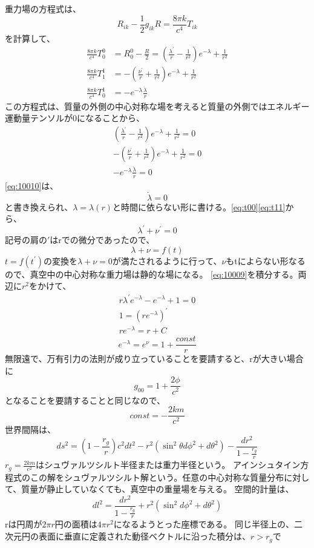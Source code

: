 \documentclass{jsarticle}
\newcommand{\half}{\frac{1}{2}}
\newcommand{\beq}{\begin{equation}}
\newcommand{\eeq}{\end{equation}}
\newcommand{\epikcf}{\frac{8 \pi k}{c^4}}
\newcommand{\nup}{\nu^\prime}
\newcommand{\lap}{\lambda^\prime}
\newcommand{\revrt}{\frac{1}{r^2}}
\begin{document}
重力場の方程式は、
\beq
R_{ik} - \half g_{ik} R = \frac{8 \pi k}{c^4}T_{ik}
\eeq
を計算して、
\begin{align}
    \epikcf T^0_0 &= R^0_0 - \frac{R}{2} = (\frac{\lambda^\prime}{r} - \frac{1}{r^2})e^{-\lambda} + \frac{1}{r^2} \label{eq:t00}\\ 
    \epikcf T^1_1 &= - (\frac{\nu^\prime}{r} + \frac{1}{r^2})e^{-\lambda} + \revrt \label{eq:t11}\\
    \epikcf T^1_0 &= - e^{-\lambda} \frac{\dot{\lambda}}{r}
\end{align}
この方程式は、質量の外側の中心対称な場を考えると質量の外側ではエネルギー運動量テンソルが$0$になることから、
\begin{align}
(\frac{\lambda^\prime}{r} - \frac{1}{r^2})e^{-\lambda} + \frac{1}{r^2} = 0\\ 
-(\frac{\nu^\prime}{r} + \frac{1}{r^2})e^{-\lambda} + \revrt = 0\label{eq:10009}\\
- e^{-\lambda} \frac{\dot{\lambda}}{r} = 0 \label{eq:10010}
\end{align}
\eqref{eq:10010}は、
\beq
\dot{\lambda} = 0 
\eeq
と書き換えられ、$\lambda = \lambda (r)$と時間に依らない形に書ける。\eqref{eq:t00}\eqref{eq:t11}から、
\beq
\lap + \nup = 0
\eeq
記号の肩の$\prime$はrでの微分であったので、
\beq
\lambda + \nu = f(t)
\eeq
$t=f(t^\prime)$の変換を$\lambda + \nu = 0$が満たされるように行って、$\nu$もtによらない形なるので、真空中の中心対称な重力場は静的な場になる。
\eqref{eq:10009}を積分する。両辺に$r^2$をかけて、
\begin{align}
r\lap e^{-\lambda} - e^{-\lambda} + 1 = 0\\
1 = (re^{-\lambda})^\prime\\
re^{-\lambda} = r + C
\end{align}
\beq
e^{-\lambda} = e^{\nu} = 1 + \frac{const}{r}
\eeq
無限遠で、万有引力の法則が成り立っていることを要請すると、rが大きい場合に
\beq
g_{00} = 1 + \frac{2\phi}{c^2}
\eeq
となることを要請することと同じなので、
\beq
const =  - \frac{2km}{c^2}
\eeq
世界間隔は、
\beq
ds^2 = (1 - \frac{r_g}{r})c^2dt^2 - r^2(\sin^2 \theta d\phi^2 +d\theta^2) - \frac{dr^2}{1-\frac{r_g}{r}}
\eeq
$r_g = \frac{2km}{c^2}$はシュヴァルツシルト半径または重力半径という。
アインシュタイン方程式のこの解をシュヴァルツシルト解という。任意の中心対称な質量分布に対して、質量が静止していなくても、真空中の重量場を与える。
空間的計量は、
\beq
dl^2 = \frac{dr^2}{1-\frac{r_g}{r}} + r^2 (\sin^2d\phi^2 + d\theta^2)
\eeq
rは円周が$2 \pi r$円の面積は$4 \pi r^2$になるようとった座標である。
同じ半径上の、二次元円の表面に垂直に定義された動径ベクトルに沿った積分は、$r>r_g$で
\end{document}

